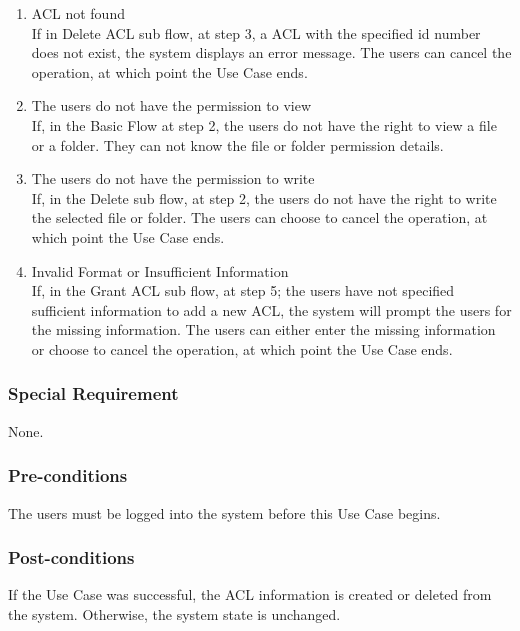 \begin{enumerate}[label=(\roman*)]
    \item ACL not found \\
If in Delete ACL sub flow, at step 3, a ACL with the specified id number does not exist, the system displays an error message. The users can cancel the operation, at which point the Use Case ends.
    \item The users do not have the permission to view\\
If, in the Basic Flow at step 2, the users do not have the right to view a file or a folder. They can not know the file or folder permission details. 
    \item The users do not have the permission to write\\
If, in the Delete sub flow, at step 2, the users do not have the right to write the selected file or folder. The users can choose to cancel the operation, at which point the Use Case ends.
    \item Invalid Format or Insufficient Information\\
If, in the Grant ACL sub flow, at step 5; the users have not specified sufficient information to add a new ACL, the system will prompt the users for the missing information. The users can either enter the missing information or choose to cancel the operation, at which point the Use Case ends.
\end{enumerate}

\subsubsection{Special Requirement}
None.
\subsubsection{Pre-conditions}
The users must be logged into the system before this Use Case begins.
\subsubsection{Post-conditions}
If the Use Case was successful, the ACL information is created or deleted from the system. Otherwise, the system state is unchanged.
